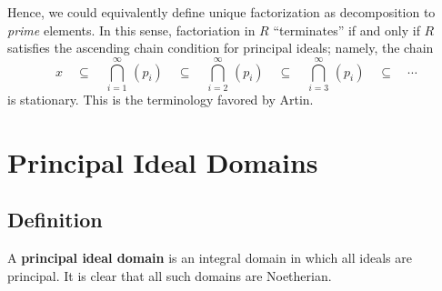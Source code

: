 \documentclass[11pt]{article}
\begin{document}
Hence, we could equivalently define unique factorization as decomposition to \textit{prime} elements. In this sense, factoriation in $R$ ``terminates'' if and only if $R$ satisfies the ascending chain condition for principal ideals; namely, the chain
\[
  x \quad \subseteq \quad \bigcap\limits_{i = 1}^{\infty} \, (p_{i}) \quad \subseteq \quad \bigcap\limits_{i = 2}^{\infty} \, (p_{i}) \quad \subseteq \quad \bigcap\limits_{i = 3}^{\infty} \, (p_{i}) \quad \subseteq \quad \cdots
\]
is stationary. This is the terminology favored by Artin.


\section{Principal Ideal Domains}


\subsection{Definition}

A \textbf{principal ideal domain} is an integral domain in which all ideals are principal. It is clear that all such domains are Noetherian.

\newpage
\end{document}
